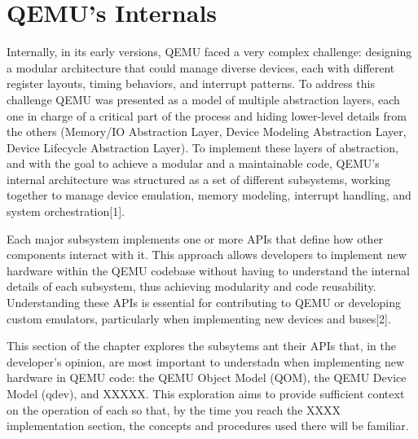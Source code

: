 \section{QEMU's Internals}
\label{chap:qemu_apis}

Internally, in its early versions, QEMU faced a very complex challenge: designing 
a modular architecture that could manage diverse devices, each with different 
register layouts, timing behaviors, and interrupt patterns. To address this 
challenge QEMU was presented as a model of multiple abstraction layers, each one in 
charge of a critical part of the process and hiding lower-level details from the others 
(Memory/IO Abstraction Layer, Device Modeling Abstraction Layer, Device Lifecycle 
Abstraction Layer). To implement these layers of abstraction, and with the goal 
to achieve a modular and a maintainable code, QEMU's internal architecture was 
structured as a set of different subsystems, working together to manage device 
emulation, memory modeling, interrupt handling, and system orchestration[1].

Each major subsystem implements one or more APIs that define how other 
components interact with it. This approach allows developers to implement new 
hardware within the QEMU codebase without having to understand the internal 
details of each subsystem, thus achieving modularity and code reusability. 
Understanding these APIs is essential for contributing to QEMU or developing custom 
emulators, particularly when implementing new devices and buses[2].

\begin{table}[H]
    \centering
    \caption
        {
            Internal QEMU APIs
        }

    \label{tab:qemu_internal_apis}
\end{table}

This section of the chapter explores the subsytems ant their APIs that, in the 
developer's opinion, are most important to understadn when implementing new 
hardware in QEMU code: the QEMU Object Model (QOM), the QEMU Device 
Model (qdev), and XXXXX. This exploration aims to provide sufficient context on 
the operation of each so that, by the time you reach the XXXX 
implementation section, the concepts and procedures used there will be familiar.





%

%